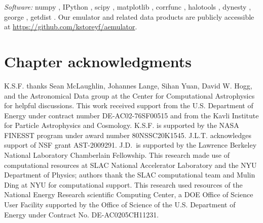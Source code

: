 \textit{Software:} numpy \citep{VanDerWalt2011}, IPython \citep{Perez2007}, scipy \citep{Virtanen2020}, matplotlib \citep{Hunter2007}, corrfunc \citep{SinhaGarrison2019, Sinha2020}, halotools \citep{Hearin2017}, dynesty \citep{Speagle2020}, george \citep{Ambikasaran2016}, getdist \citep{Lewis2019}.
Our emulator and related data products are publicly accessible at \url{https://github.com/kstoreyf/aemulator}.

\section{Chapter acknowledgments}

K.S.F. thanks Sean McLaughlin, Johannes Lange, Sihan Yuan, David W. Hogg, and the Astronomical Data group at the Center for Computational Astrophysics for helpful discussions.
This work received support from the U.S. Department of Energy under contract number DE-AC02-76SF00515 and from the Kavli Institute for Particle Astrophysics and Cosmology.
K.S.F. is supported by the NASA FINESST program under award number 80NSSC20K1545.
J.L.T. acknowledges support of NSF grant AST-2009291.
J.D.~is supported by the Lawrence Berkeley National Laboratory Chamberlain Fellowship.
This research made use of computational resources at SLAC National Accelerator Laboratory and the NYU Department of Physics; authors thank the SLAC computational team and Mulin Ding at NYU for computational support.
This research used resources of the National Energy Research scientific Computing Center, a DOE Office of Science User Facility supported by the Office of Science of the U.S. Department of Energy under Contract No. DE-AC0205CH11231.


